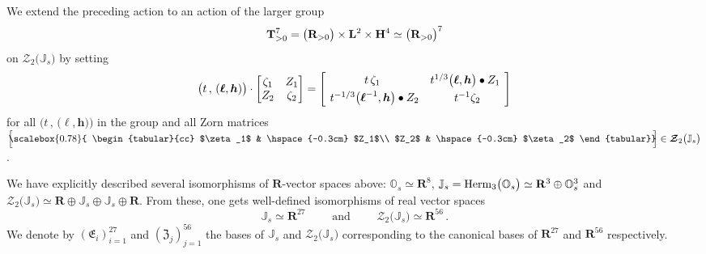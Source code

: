 \documentclass[11pt]{amsart}
\newcommand{\sk}{\smallskip}
\begin{document}
We extend the preceding action to an action of the larger group 
$$ {\bf T}^7_{>0}= \big(\mathbf R_{>0}\big)\times {\bf L}^2 
\times 
{\bf H}^4 
\simeq \big( \mathbf R_{>0}\big)^7
$$
 on  $\boldsymbol{\mathcal Z}_2\big(\mathbb J_s\big)$ by setting 
\begin{equation}%
\label{Eq:H(E7)-action}
\big( t\, ,\, (\boldsymbol{\ell}, \boldsymbol{h})\big) \cdot   \begin{bmatrix}
\zeta_1 &    Z_1 \\
 Z_2 & \zeta_2 
\end{bmatrix}
=\begin{bmatrix}
t\, \zeta_1 &   t^{1/3} \big(\boldsymbol{\ell}, \boldsymbol{h}\big) \bullet Z_1 
\,\,{}^{}
\vspace{0.1cm}\\
{}^{}\, \,  t^{-1/3}  \big(\boldsymbol{\ell}^{-1}, \boldsymbol{h}\big)
\bullet Z_2 & t^{-1}\zeta_2 
\end{bmatrix}
\end{equation}%
for all $( t\, ,\, \big(\boldsymbol{\ell}, \boldsymbol{h}\big)\big)$ in the group and all Zorn matrices  
$\Big[
\hspace{-0.15cm}
\scalebox{0.78}{
\begin{tabular}{cc}
$\zeta_1$ & \hspace{-0.3cm} $Z_1$\\
$Z_2$ & \hspace{-0.3cm}  $\zeta_2$
\end{tabular}}\hspace{-0.12cm} \Big]\in \boldsymbol{\mathcal Z}_2\big(\mathbb J_s\big)$. 
\sk


We have explicitly described several isomorphisms of 
${\mathbf R}$-vector spaces above:  
$\mathbb O_s\simeq \mathbf R^8$, $\mathbb J_s={\rm Herm}_3\big( 
\mathbb O_s \big) \simeq \mathbf R^3\oplus \mathbb O_s^{3}$ and 
$\boldsymbol{\mathcal Z}_2\big(\mathbb J_s\big)\simeq \mathbf R\oplus 
\mathbb J_s\oplus \mathbb J_s \oplus \mathbf R$. From these, one gets 
well-defined isomorphisms of real vector spaces 
\begin{equation}%
\label{Eq:R-ev-Isom}
\mathbb J_s\simeq \mathbf R^{27}
\qquad 
\mbox{ and }
 \qquad \boldsymbol{\mathcal Z}_2\big(\mathbb J_s\big)\simeq \mathbf R^{56}\,.
\end{equation}%
We denote by 
$(\mathfrak E_i)_{i=1}^{27}$ and $(\mathfrak Z_j)_{j=1}^{56}$ 
the bases of 
$\mathbb J_s$ and 
$\boldsymbol{\mathcal Z}_2\big(\mathbb J_s\big)$ corresponding  to the canonical bases of 
$\mathbf R^{27}$  and $\mathbf R^{56}$ respectively. 
\end{document}
